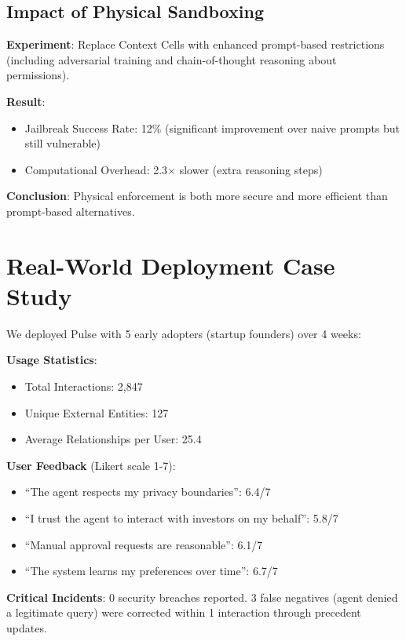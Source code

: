 \subsection{Impact of Physical Sandboxing}

\textbf{Experiment}: Replace Context Cells with enhanced prompt-based restrictions (including adversarial training and chain-of-thought reasoning about permissions).

\textbf{Result}:
\begin{itemize}
    \item Jailbreak Success Rate: 12\% (significant improvement over naive prompts but still vulnerable)
    \item Computational Overhead: 2.3$\times$ slower (extra reasoning steps)
\end{itemize}

\textbf{Conclusion}: Physical enforcement is both more secure and more efficient than prompt-based alternatives.

\section{Real-World Deployment Case Study}

We deployed Pulse with 5 early adopters (startup founders) over 4 weeks:

\textbf{Usage Statistics}:
\begin{itemize}
    \item Total Interactions: 2,847
    \item Unique External Entities: 127
    \item Average Relationships per User: 25.4
\end{itemize}

\textbf{User Feedback} (Likert scale 1-7):
\begin{itemize}
    \item ``The agent respects my privacy boundaries'': 6.4/7
    \item ``I trust the agent to interact with investors on my behalf'': 5.8/7
    \item ``Manual approval requests are reasonable'': 6.1/7
    \item ``The system learns my preferences over time'': 6.7/7
\end{itemize}

\textbf{Critical Incidents}: 0 security breaches reported. 3 false negatives (agent denied a legitimate query) were corrected within 1 interaction through precedent updates.


